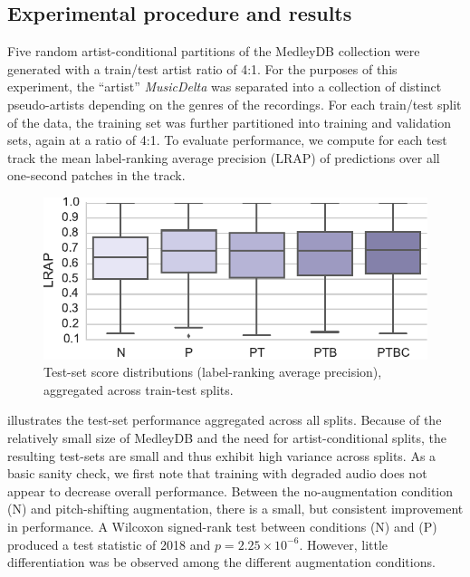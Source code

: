 \documentclass{article}
\begin{document}
\subsection{Experimental procedure and results}

Five random artist-conditional partitions of the MedleyDB collection were generated with
a train/test artist ratio of 4:1.  For the purposes of this experiment,
the ``artist'' \emph{MusicDelta} was separated into a collection of distinct pseudo-artists
depending on the genres of the recordings.
For each train/test split of the data, the training set was further partitioned into
training and validation sets, again at a ratio of 4:1.
To evaluate performance, we compute for each test track the mean label-ranking average
precision (LRAP) of predictions over all one-second patches in the track.  


\begin{figure}
    \centering
    \includegraphics[width=\columnwidth]{figs/lrapall}
    \caption{Test-set score distributions (label-ranking average precision), aggregated
        across train-test splits.\label{lrapresults}}
\end{figure}

 illustrates the test-set performance aggregated across all splits. 
Because of the relatively small size of MedleyDB and the need for
artist-conditional splits, the resulting test-sets are small and thus exhibit high
variance across splits.  
As a basic sanity check, we first note that training with degraded audio does not appear
to decrease overall performance.
Between the no-augmentation condition (N) and pitch-shifting augmentation, there is a
small, but consistent improvement in performance.  A Wilcoxon signed-rank test between
conditions (N) and (P) produced a test statistic of 2018 and $p=2.25\times 10^{-6}$.
However, little differentiation was be observed among the different augmentation conditions.
\end{document}
